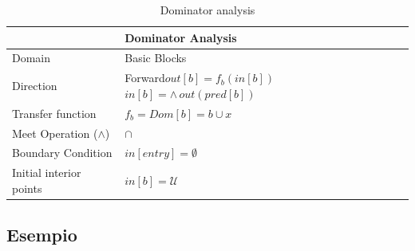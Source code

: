 \documentclass[10pt,a4paper]{article}
\begin{document}
\begin{table}[h!]
  \centering
  \begin{tabular}{|l|p{4cm}|}
    \hline
    \textbf{} & \textbf{Dominator Analysis} \\
    \hline
    Domain & Basic Blocks\\
    \hline
    Direction & Forward\newline $out[b]=f_{b}(in[b])$\newline $in[b]=\wedge\, out(pred[b])$\\
    \hline
    Transfer function & $f_b = Dom[b] = b \cup x$\\
    \hline
    Meet Operation (\(\land\)) & $\cap$ \\
    \hline
    Boundary Condition & $in[entry] = \emptyset $\\
    \hline
    Initial interior points & $in[b] = \mathcal{U} $ \\
    \hline
  \end{tabular}
  \caption{Dominator analysis}
\end{table}

\subsection{Esempio}
\end{document}
